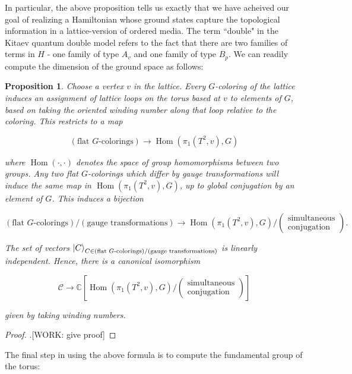 \documentclass{article}
\newtheorem{proposition}{Proposition}[section]
\theoremstyle{definition}
\DeclareMathOperator{\Hom}{Hom}
\newcommand{\CC}{\mathbb{C}}
\newcommand{\Cc}{\mathcal{C}}
\newcommand{\0}{\left|0\right>}
\newcommand{\1}{\left|1\right>}
\numberwithin{figure}{section}
\begin{document}
In particular, the above proposition tells us exactly that we have acheived our goal of realizing a Hamiltonian whose ground states capture the topological information in a lattice-version of ordered media.  The term ``double" in the Kitaev quantum double model refers to the fact that there are two families of terms in $H$ - one family of type $A_v$ and one family of type $B_p$. We can readily compute the dimension of the ground space as follows:

\begin{proposition} Choose a vertex $v$ in the lattice. Every $G$-coloring of the lattice induces an assignment of lattice loops on the torus based at $v$ to elements of $G$, based on taking the oriented winding number along that loop relative to the coloring. This restricts to a map

$$(\text{flat $G$-colorings})\xrightarrow{}\Hom(\pi_1(T^2,v), G)$$

where $\Hom(\cdot,\cdot)$ denotes the space of group homomorphisms between two groups. Any two flat $G$-colorings which differ by gauge transformations will induce the same map in $\Hom(\pi_1(T^2,v), G)$, up to global conjugation by an element of $G$. This induces a bijection

$$(\text{flat $G$-colorings})/(\text{gauge transformations})\xrightarrow{}\Hom(\pi_1(T^2,v), G)/\left(\substack{\text{simultaneous} \\ \text{conjugation}}\right).$$

The set of vectors ${\ket{C}}_{C\in (\text{flat $G$-colorings})/(\text{gauge transformations})}$ is linearly independent. Hence, there is a canonical isomorphism

$$\Cc \xrightarrow{}\CC[\Hom(\pi_1(T^2,v), G)/\left(\substack{\text{simultaneous} \\ \text{conjugation}}\right)]$$

given by taking winding numbers.
\end{proposition}
\begin{proof}.[WORK: give proof]
\end{proof}

The final step in using the above formula is to compute the fundamental group of the torus:
\end{document}
